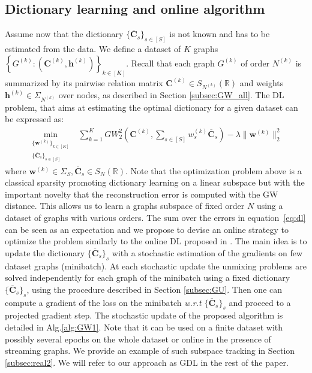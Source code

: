 \documentclass{article}
\def\eqref#1{equation~\ref{#1}}
\def\vh{{\bm{h}}}
\def\vw{{\bm{w}}}
\def\mC{{\bm{C}}}
\newcommand{\R}{\mathbb{R}}
\def\R{{\mathbb{R}}}
\begin{document}
	\subsection{Dictionary learning and online algorithm}\label{subsec:algos}
	Assume now that the dictionary $\{\overline{\mC}_s\}_{s \in [S]}$ is not known
	and has to be estimated from the data.
	We define a dataset of $K$ graphs $\left\{ G^{(k)} :
	(\mC^{(k)},\vh^{(k)}) \right\}_{k \in [K]}$. Recall that each graph $G^{(k)}$ of
	order $N^{(k)}$ is summarized by its pairwise relation matrix $\mC^{(k)} \in
	S_{N^{(k)}}(\R)$ and weights $\vh^{(k)} \in \Sigma_{N^{(k)}}$ over nodes, as
	described in Section \ref{subsec:GW_all}.
	The DL problem, that aims at estimating the optimal dictionary
	for a given dataset can be expressed as:
	\begin{align}
	\min_{\begin{smallmatrix}\{\vw^{(k)}\}_{k\in [K]} \\
		\{\overline{\mC}_s\}_{s \in [S]} \end{smallmatrix}} &\sum_{k=1}^K GW^2_2\left(\mC^{(k)},\sum_{s \in [S]} w^{(k)}_s \overline{\mC}_s\right)- \lambda \|\vw^{(k)}\|^2_2 \label{eq:dl}
	\end{align}
	where $\vw^{(k)} \in \Sigma_S, \overline{\mC}_s \in S_N(\R)$. Note that the optimization problem above is a classical sparsity promoting
	dictionary learning on a linear subspace but with the important novelty
	that the reconstruction error is computed with the GW distance. This allows us to learn a graphs
	subspace of fixed
	order $N$ using a dataset of graphs with various orders.
	The sum over the errors in \eqref{eq:dl} can be seen as an expectation and we
	propose to devise an online strategy to optimize the problem similarly to the
	online DL proposed in \citep{mairal2009online}. The main
	idea is to update the dictionary $\{\overline{\mC}_s\}_s$ with a stochastic
	estimation of the gradients on few dataset graphs (minibatch). At each
	stochastic update the unmixing problems are solved independently for each
	graph of the minibatch using a fixed dictionary 
	$\{\overline{\mC}_s\}_s$, {using the procedure described in Section
		\ref{subsec:GU}}. Then one can compute a gradient of the loss on the minibatch
	\emph{w.r.t} 
	$\{\overline{\mC}_s\}_s$ and proceed to a projected gradient step.  The
	stochastic update of the proposed
	algorithm is detailed in Alg.\ref{alg:GW1}. Note that it
	can be used on a finite dataset with possibly several epochs on the whole
	dataset or online in the presence of streaming graphs. We provide an example
	of such subspace tracking in Section \ref{subsec:real2}.  We will refer to our
	approach as GDL in the rest of the paper.
\end{document}
